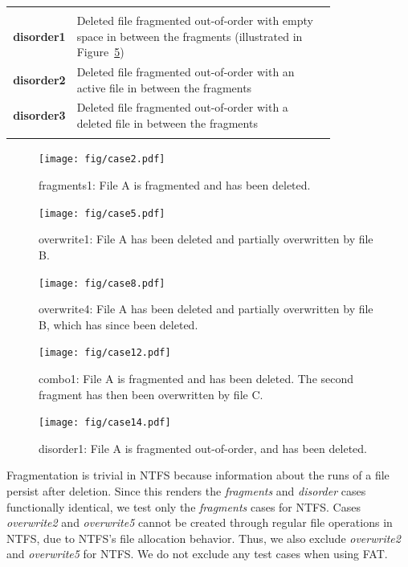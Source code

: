 \begin{table}[ht!]
{\begin{tabular*}{\textwidth}{@{}rp{0.8\linewidth}@{}}
\colrule
\multicolumn{2}{c}{\textbf{Deleted File is Fragmented Out-of-Order}} \\ \colrule
\textbf{disorder1} & Deleted file fragmented out-of-order with empty space in between the fragments (illustrated in Figure~\ref{fig:case14}) \\
\textbf{disorder2} & Deleted file fragmented out-of-order with an active file in between the fragments \\
\textbf{disorder3} & Deleted file fragmented out-of-order with a deleted file in between the fragments \\
\botrule
\end{tabular*}}
\label{meta_cases}
\end{table}


\begin{figure}
    \centering
    \texttt{[image: fig/case2.pdf]}
    \caption{fragments1: File A is fragmented and has been deleted.}
    \label{fig:case2}
\end{figure}

\begin{figure}
    \centering
    \texttt{[image: fig/case5.pdf]}
    \caption{overwrite1: File A has been deleted and partially overwritten by file B.}
    \label{fig:case5}
\end{figure}

\begin{figure}[h]
    \centering
    \texttt{[image: fig/case8.pdf]}
    \caption{overwrite4: File A has been deleted and partially overwritten by file B, which has since been deleted.}
    \label{fig:case8}
\end{figure}

\begin{figure}[h]
    \centering
    \texttt{[image: fig/case12.pdf]}
    \caption{combo1: File A is fragmented and has been deleted. The second fragment has then been overwritten by file C.}
    \label{fig:case12}
\end{figure}

\begin{figure}[h]
        \centering
        \texttt{[image: fig/case14.pdf]}
        \caption{disorder1: File A is fragmented out-of-order, and has been deleted.}
        \label{fig:case14}
\end{figure}


Fragmentation is trivial in NTFS because information about the runs of a file persist after deletion.
Since this renders the \emph{fragments} and \emph{disorder} cases functionally identical, we test only the \emph{fragments} cases for NTFS.
Cases \emph{overwrite2} and \emph{overwrite5} cannot be created through regular file operations in NTFS, due to NTFS's file allocation behavior.
Thus, we also exclude \emph{overwrite2} and \emph{overwrite5} for NTFS.
We do not exclude any test cases when using FAT.


